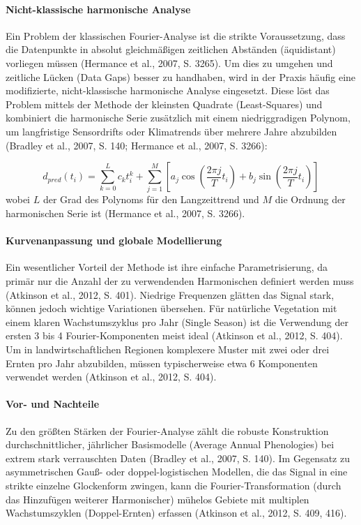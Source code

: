 \documentclass[11pt]{report}
\begin{document}
\paragraph{Nicht-klassische harmonische Analyse}
Ein Problem der klassischen Fourier-Analyse ist die strikte Voraussetzung, dass die Datenpunkte in absolut gleichmäßigen zeitlichen Abständen (äquidistant) vorliegen müssen (Hermance et al., 2007, S. 3265). Um dies zu umgehen und zeitliche Lücken (Data Gaps) besser zu handhaben, wird in der Praxis häufig eine modifizierte, nicht-klassische harmonische Analyse eingesetzt. Diese löst das Problem mittels der Methode der kleinsten Quadrate (Least-Squares) und kombiniert die harmonische Serie zusätzlich mit einem niedriggradigen Polynom, um langfristige Sensordrifts oder Klimatrends über mehrere Jahre abzubilden (Bradley et al., 2007, S. 140; Hermance et al., 2007, S. 3266):

\begin{equation}
d_{pred}(t_i) = \sum_{k=0}^L c_k t_i^k + \sum_{j=1}^M \left[ a_j \cos\left(\frac{2\pi j}{T} t_i\right) + b_j \sin\left(\frac{2\pi j}{T} t_i\right) \right]
\end{equation}
wobei $L$ der Grad des Polynoms für den Langzeittrend und $M$ die Ordnung der harmonischen Serie ist (Hermance et al., 2007, S. 3266).

\paragraph{Kurvenanpassung und globale Modellierung}
Ein wesentlicher Vorteil der Methode ist ihre einfache Parametrisierung, da primär nur die Anzahl der zu verwendenden Harmonischen definiert werden muss (Atkinson et al., 2012, S. 401). Niedrige Frequenzen glätten das Signal stark, können jedoch wichtige Variationen übersehen. Für natürliche Vegetation mit einem klaren Wachstumszyklus pro Jahr (Single Season) ist die Verwendung der ersten 3 bis 4 Fourier-Komponenten meist ideal (Atkinson et al., 2012, S. 404). Um in landwirtschaftlichen Regionen komplexere Muster mit zwei oder drei Ernten pro Jahr abzubilden, müssen typischerweise etwa 6 Komponenten verwendet werden (Atkinson et al., 2012, S. 404). 

\paragraph{Vor- und Nachteile}
Zu den größten Stärken der Fourier-Analyse zählt die robuste Konstruktion durchschnittlicher, jährlicher Basismodelle (Average Annual Phenologies) bei extrem stark verrauschten Daten (Bradley et al., 2007, S. 140). Im Gegensatz zu asymmetrischen Gauß- oder doppel-logistischen Modellen, die das Signal in eine strikte einzelne Glockenform zwingen, kann die Fourier-Transformation (durch das Hinzufügen weiterer Harmonischer) mühelos Gebiete mit multiplen Wachstumszyklen (Doppel-Ernten) erfassen (Atkinson et al., 2012, S. 409, 416).
\end{document}
